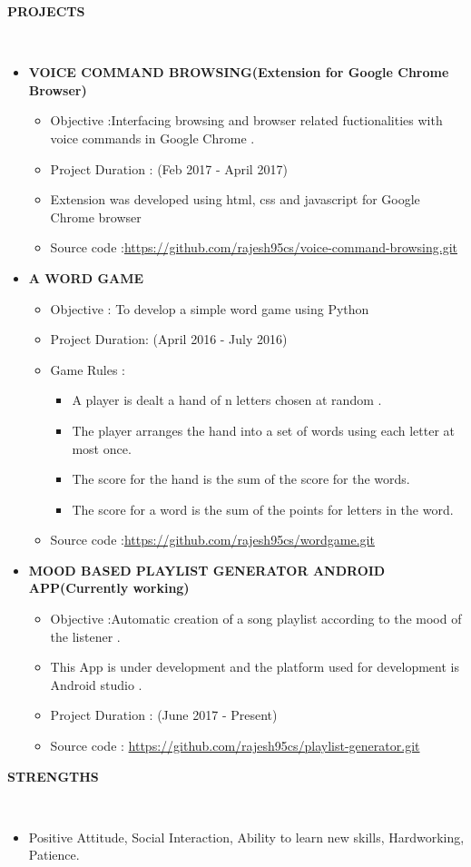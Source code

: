 \documentclass[a4paper,10pt]{article}
\newcommand{\isep}{-2 pt}
\newcommand{\lsep}{-0.5cm}
\newcommand{\resheading}[1]{{\small \colorbox{mygrey}{\begin{minipage}{0.975\textwidth}{\textbf{#1 \vphantom{p\^{E}}}}\end{minipage}}}}
\begin{document}
\resheading{\textbf{PROJECTS } }\\[\lsep]
\begin{itemize}
\item \textbf{VOICE COMMAND BROWSING(Extension for Google Chrome Browser)
} 
	\begin{itemize}\itemsep \isep
	\item Objective :Interfacing browsing and browser related fuctionalities with voice commands in   Google Chrome .
    \item Project Duration : (Feb 2017 - April 2017)
	\item Extension was developed using html, css and javascript for Google Chrome browser

	\item Source code :\url{https://github.com/rajesh95cs/voice-command-browsing.git}
    \end{itemize} 
\item \textbf{A WORD GAME}
\begin{itemize}\itemsep \isep
    
    \item Objective : To develop a simple word game using Python
    \item Project Duration: (April 2016 - July 2016)
    
    \item Game Rules :  \begin{itemize}
    \item A player is dealt a hand of n letters chosen at random .  \item The player arranges the hand into a set of words using each letter at most once. \item The score for the hand is the sum of the score for the words. \item The score for a word is the sum of the points for letters in the word. 
    \end{itemize}
    
                 


    \item Source code :\url{https://github.com/rajesh95cs/wordgame.git} 
	\end{itemize}
    
    \item \textbf{MOOD BASED PLAYLIST GENERATOR ANDROID APP(Currently working)}
\begin{itemize}\itemsep \isep
    \item Objective :Automatic creation of a song playlist according to the mood of the listener .

    \item This App is under development and the platform used for development is Android studio .
    \item Project Duration : (June 2017 - Present)
    \item Source code : \url{https://github.com/rajesh95cs/playlist-generator.git}
	\end{itemize}



\end{itemize}

\resheading{\textbf{STRENGTHS} }\\[\lsep]
\begin{itemize}
\item \noindent Positive Attitude, Social Interaction, Ability to learn new skills, Hardworking, Patience.
\end{itemize}
\end{document}

